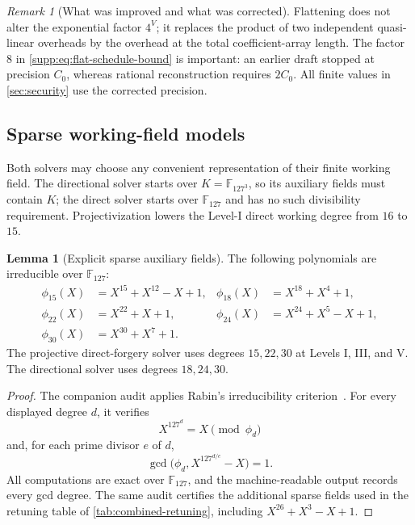 \documentclass[11pt,a4paper]{article}
\theoremstyle{definition}
\newtheorem{lemma}[theorem]{Lemma}
\theoremstyle{remark}
\newtheorem{remark}[theorem]{Remark}
\newcommand{\F}{\mathbb F}
\begin{document}
\begin{remark}[What was improved and what was corrected]\label{supp:rem:no-double-log-product}
Flattening does not alter the exponential factor $4^V$; it replaces the product of two independent quasi-linear overheads by the overhead at the total coefficient-array length.  The factor $8$ in \eqref{supp:eq:flat-schedule-bound} is important: an earlier draft stopped at precision $C_0$, whereas rational reconstruction requires $2C_0$.  All finite values in \cref{sec:security} use the corrected precision.
\end{remark}

\subsection{Sparse working-field models}\label{supp:sec:sparse-fields}
Both solvers may choose any convenient representation of their finite working
field.  The directional solver starts over $K=\F_{127^3}$, so its auxiliary
fields must contain $K$; the direct solver starts over $\F_{127}$ and has no
such divisibility requirement.  Projectivization lowers the Level-I direct
working degree from $16$ to $15$.

\begin{lemma}[Explicit sparse auxiliary fields]\label{supp:lem:sparse-fields}
The following polynomials are irreducible over $\F_{127}$:
\begin{align*}
 \phi_{15}(X)&=X^{15}+X^{12}-X+1,
 &\phi_{18}(X)&=X^{18}+X^4+1,\\
 \phi_{22}(X)&=X^{22}+X+1,
 &\phi_{24}(X)&=X^{24}+X^5-X+1,\\
 \phi_{30}(X)&=X^{30}+X^7+1.
\end{align*}
The projective direct-forgery solver uses degrees $15,22,30$ at Levels I,
III, and V.  The directional solver uses degrees $18,24,30$.
\end{lemma}

\begin{proof}
The companion audit applies Rabin's irreducibility criterion~\cite{Rabin1980}.
For every displayed degree $d$, it verifies
\[
 X^{127^d}=X\pmod{\phi_d}
\]
and, for each prime divisor $e$ of $d$,
\[
 \gcd\bigl(\phi_d,X^{127^{d/e}}-X\bigr)=1.
\]
All computations are exact over $\F_{127}$, and the machine-readable output
records every gcd degree.  The same audit certifies the additional sparse
fields used in the retuning table of \cref{tab:combined-retuning}, including
$X^{26}+X^3-X+1$.
\end{proof}
\end{document}
